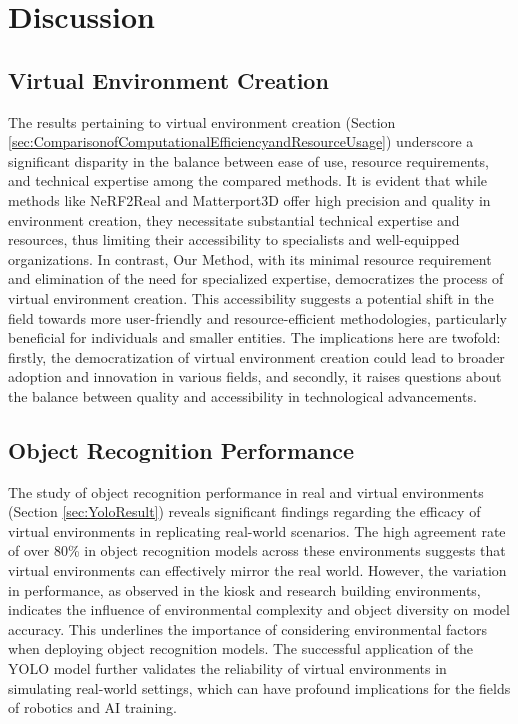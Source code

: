 \chapter{Discussion}
\label{chap:discussion}

\section{Virtual Environment Creation}
\label{sec:Virtual Environment Creation}
The results pertaining to virtual environment creation (Section \ref{sec:ComparisonofComputationalEfficiencyandResourceUsage}) underscore a significant disparity in the balance between ease of use, resource requirements, and technical expertise among the compared methods. It is evident that while methods like NeRF2Real and Matterport3D offer high precision and quality in environment creation, they necessitate substantial technical expertise and resources, thus limiting their accessibility to specialists and well-equipped organizations. In contrast, Our Method, with its minimal resource requirement and elimination of the need for specialized expertise, democratizes the process of virtual environment creation. This accessibility suggests a potential shift in the field towards more user-friendly and resource-efficient methodologies, particularly beneficial for individuals and smaller entities. The implications here are twofold: firstly, the democratization of virtual environment creation could lead to broader adoption and innovation in various fields, and secondly, it raises questions about the balance between quality and accessibility in technological advancements.

\section{Object Recognition Performance}
\label{sec:Object Recognition Performance}
The study of object recognition performance in real and virtual environments (Section \ref{sec:YoloResult}) reveals significant findings regarding the efficacy of virtual environments in replicating real-world scenarios. The high agreement rate of over 80\% in object recognition models across these environments suggests that virtual environments can effectively mirror the real world. However, the variation in performance, as observed in the kiosk and research building environments, indicates the influence of environmental complexity and object diversity on model accuracy. This underlines the importance of considering environmental factors when deploying object recognition models. The successful application of the YOLO model further validates the reliability of virtual environments in simulating real-world settings, which can have profound implications for the fields of robotics and AI training.

